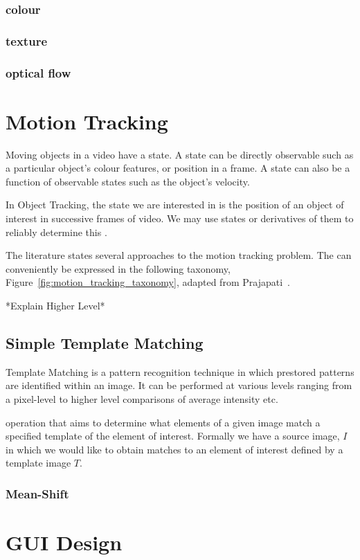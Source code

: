 \subsubsection{colour}

\subsubsection{texture}

\subsubsection{optical flow}


\section{Motion Tracking}
Moving objects in a video have a state. A state can be directly observable such as a
particular object's colour features, or position in a frame. A state can also be a function
of observable states such as the object's velocity.

In Object Tracking, the state we are interested in is the position of an object
of interest in successive frames of video. We may use states or derivatives of
them to reliably determine this \cite{Forsyth2012}.

The literature states several approaches to the motion tracking problem. The can
conveniently be expressed in the following taxonomy, Figure~\ref{fig:motion_tracking_taxonomy},
adapted from Prajapati~\cite{Prajapati2015}.


*Explain Higher Level*

\subsection{Simple Template Matching}
Template Matching is a pattern recognition technique in which prestored patterns
are identified within an image. It can be performed at various levels ranging
from a pixel-level to higher level comparisons of average intensity
etc\cite{Brunelli}.

operation that aims to determine
what elements of a given image match a specified template of the element of
interest.
Formally we have a source image, $I$ in which we would like to obtain matches to
an element of interest defined by a template image $T$.

\subsubsection{Mean-Shift}\label{literature_review_mean_shift}


\section{GUI Design}



